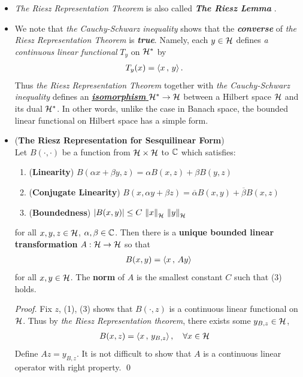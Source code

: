 \documentclass[11pt]{article}
\begin{document}
\begin{itemize}
\item \begin{remark}
\emph{The Riesz Representation Theorem} \citep{conway2019course, kreyszig1989introductory} is also called \emph{\textbf{The Riesz Lemma}} \citep{reed1980methods}.
\end{remark}

\item \begin{remark}
We note that \emph{the Cauchy-Schwarz inequality} shows that the \emph{\textbf{converse}} of \emph{the Riesz Representation Theorem} is \emph{\textbf{true}}. Namely, each $y \in {\mathcal H}$ defines \emph{a continuous linear functional} $T_y$ on ${\mathcal H}^{*}$ by
\begin{align*}
T_y(x) &= \left\langle x\,,\, y \right\rangle.
\end{align*}
Thus \emph{the Riesz Representation Theorem} together with \emph{the Cauchy-Schwarz inequality} defines an \underline{\emph{\textbf{isomorphism}}  ${\mathcal H}^{*} \rightarrow {\mathcal H}$} between a Hilbert space ${\mathcal H}$ and its dual ${\mathcal H}^{*}$. In other words, unlike the case in Banach space, the bounded linear functional on Hilbert space has a simple form.
\end{remark}

\item \begin{corollary} (\textbf{The Riesz Representation for Sesquilinear Form})\\
Let $B(\cdot, \cdot)$ be a function from ${\mathcal H} \times  {\mathcal H}$ to ${\mathbb C}$ which satisfies:
\begin{enumerate}
\item (\textbf{Linearity}) $B(\alpha x + \beta y, z) = \alpha B(x, z) + \beta B(y, z)$
\item (\textbf{Conjugate Linearity}) $B(x, \alpha y + \beta z) = \overline{\alpha} B(x, y) + \overline{\beta} B(x, z)$
\item (\textbf{Boundedness}) $\left\lvert B(x, y) \right\rvert \le C\,\left\|x\right\|_{{\mathcal H}}\,\left\|y\right\|_{{\mathcal H}} $
\end{enumerate} for all $x, y, z \in {\mathcal H}$, $\alpha, \beta \in {\mathbb C}$. Then there is a \textbf{unique bounded linear transformation} $A: {\mathcal H} \rightarrow {\mathcal H}$ so that
\begin{align*}
B(x, y) = \left\langle x\,,\, Ay \right\rangle
\end{align*} for all $x, y \in {\mathcal H}$. The \textbf{norm} of $A$ is the smallest constant $C$ such that (3) holds.
\end{corollary}
\begin{proof}
Fix $z$, (1), (3) shows that $B(\cdot, z)$ is a continuous linear functional on ${\mathcal H}$. Thus by \emph{the Riesz Representation theorem}, there exists some $y_{B,z} \in {\mathcal H}$, 
\begin{align*}
B(x, z) &= \left\langle x\,,\, y_{B,z} \right\rangle, \quad \forall x\in {\mathcal H}
\end{align*} Define $A z = y_{B,z}$. It is not difficult to show that $A$ is a continuous linear operator with right property. \qed 
\end{proof}


\end{itemize}
\end{document}
